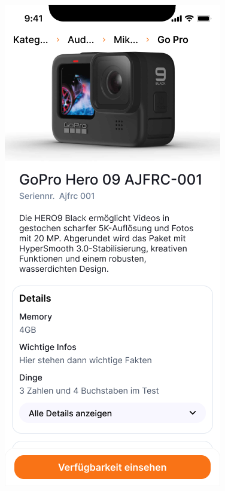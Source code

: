\begin{figure}[h]
    \centering
    \includegraphics[scale=0.3]{Bilder/Prototyp/Datailansicht.png}

\end{figure}
